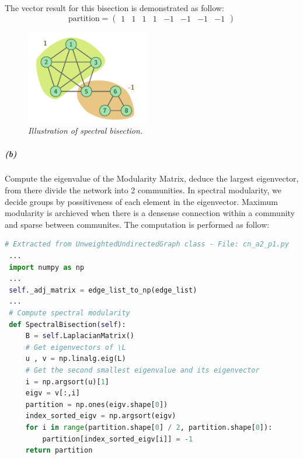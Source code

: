 \documentclass[a4paper,12pt]{article}
\begin{document}
\noindent
The vector result for this bisection is demonstrated as follow:
\[ \mbox{partition} = \left( \begin{array}{cccccccc} 1 & 1 & 1 & 1 & -1 & -1 & -1 & -1 \end{array} \right) \]

\begin{figure}
    \vspace{-2em}
    \centering
      \includegraphics[width=0.48\textwidth]{cn_a2_bisec}
    \vspace{-1em}
    \caption{\emph{Illustration of spectral bisection.}}
    \label{fig:bisec}
    \vspace{-2em}
\end{figure}

\subparagraph{(b)} Compute the eigenvalue of the Modularity Matrix, deduce the largest eigenvector, from there divide the network into 2 communities.
\noindent
In spectral modularity, we decide groups by possitiveness of each element in the eigenvector. Maximum modularity is archieved when there is a densense connection within a community and sparse between communites. The computation is performed as follow:
\pagebreak

 \begin{lstlisting}[language=Python, caption={Perform Spectral Modularity on the graph}, label={lst:bisec}]
 # Extracted from UnweightedUndirectedGraph class - File: cn_a2_p1.py
 ...
 import numpy as np
 ...
 self._adj_matrix = edge_list_to_np(edge_list)
 ...
 # Compute spectral modularity
 def SpectralBisection(self):
     B = self.LaplacianMatrix()
     # Get eigenvectors of \L
     u , v = np.linalg.eig(L)
     # Get the second smallest eigenvalue and its eigenvector
     i = np.argsort(u)[1]
     eigv = v[:,i]
     partition = np.ones(eigv.shape[0])
     index_sorted_eigv = np.argsort(eigv)
     for i in range(partition.shape[0] / 2, partition.shape[0]):
         partition[index_sorted_eigv[i]] = -1
     return partition
\end{lstlisting}
\end{document}
